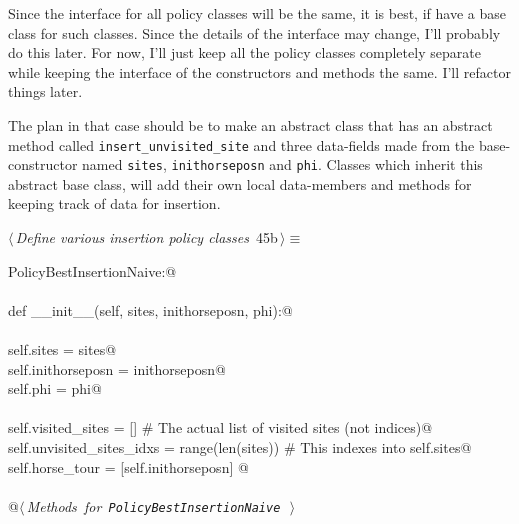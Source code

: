 \documentclass[11.5pt]{report}
\begin{document}
\newchunk Since the interface for all policy classes will be the same, it is 
best, if have a base class for such classes. Since the details of 
the interface may change, I'll probably do this later. For now, 
I'll just keep all the policy classes completely separate while 
keeping the interface of the constructors and methods the same. 
I'll refactor things later. 

The plan in that case should be to make an abstract class that 
has an abstract method called \texttt{insert\_unvisited\_site}
and three data-fields made from the base-constructor named \texttt{sites}, \texttt{inithorseposn}
and \texttt{phi}. Classes which inherit this abstract base class, will 
add their own local data-members and methods for keeping track of 
data for insertion. 

\begin{flushleft} \small\label{scrap68}\raggedright\small
{} $\langle\,${\itshape Define various insertion policy classes}\nobreak\ {\footnotesize {45b}}$\,\rangle\equiv$
\vspace{-1ex}
\begin{list}{}{} \item
\mbox{}\verb@class PolicyBestInsertionNaive:@\\
\mbox{}\verb@@\\
\mbox{}\verb@    def __init__(self, sites, inithorseposn, phi):@\\
\mbox{}\verb@@\\
\mbox{}\verb@         self.sites           = sites@\\
\mbox{}\verb@         self.inithorseposn   = inithorseposn@\\
\mbox{}\verb@         self.phi             = phi@\\
\mbox{}\verb@@\\
\mbox{}\verb@         self.visited_sites        = []                # The actual list of visited sites (not indices)@\\
\mbox{}\verb@         self.unvisited_sites_idxs = range(len(sites)) # This indexes into self.sites@\\
\mbox{}\verb@         self.horse_tour           = [self.inithorseposn]         @\\
\mbox{}\verb@@\\
\mbox{}\verb@    @\hbox{$\langle\,${\itshape Methods for \verb|PolicyBestInsertionNaive|}\nobreak\ {\footnotesize {}}$\,\rangle$}\verb@@\\
\mbox{}\verb@@{\NWsep}
\end{list}

\end{flushleft}
\end{document}
